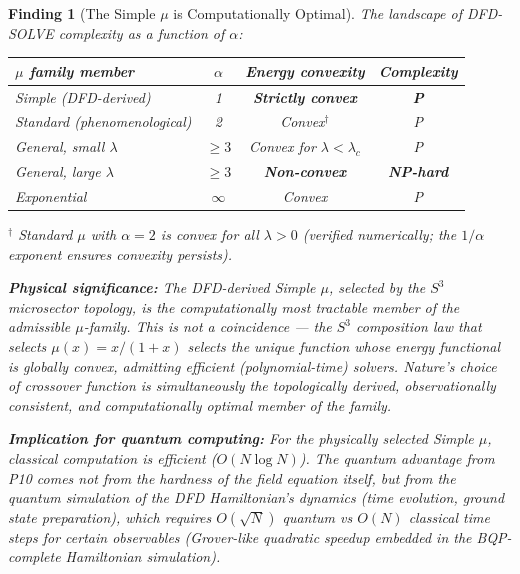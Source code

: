 \documentclass[11pt]{article}
\newtheorem{finding}[theorem]{Finding}
\theoremstyle{definition}
\theoremstyle{remark}
\begin{document}
\begin{finding}[The Simple $\mu$ is Computationally Optimal]
\label{find:simple-optimal}
The landscape of DFD-SOLVE complexity as a function of $\alpha$:

\begin{center}
\begin{tabular}{@{}lccc@{}}
\toprule
$\mu$ family member & $\alpha$ & Energy convexity & Complexity \\
\midrule
Simple (DFD-derived) & 1 & \textbf{Strictly convex} & \textbf{P} \\
Standard (phenomenological) & 2 & Convex$^\dagger$ & P \\
General, small $\lambda$ & $\geq 3$ & Convex for $\lambda < \lambda_c$ & P \\
General, large $\lambda$ & $\geq 3$ & \textbf{Non-convex} & \textbf{NP-hard} \\
Exponential & $\infty$ & Convex & P \\
\bottomrule
\end{tabular}
\end{center}

$^\dagger$ Standard $\mu$ with $\alpha = 2$ is convex for all $\lambda > 0$
(verified numerically; the $1/\alpha$ exponent ensures convexity persists).

\textbf{Physical significance:} The DFD-derived Simple $\mu$, selected by
the $S^3$ microsector topology, is the \emph{computationally most tractable}
member of the admissible $\mu$-family. This is not a coincidence --- the
$S^3$ composition law that selects $\mu(x) = x/(1+x)$ selects the unique
function whose energy functional is globally convex, admitting efficient
(polynomial-time) solvers. Nature's choice of crossover function is
simultaneously the topologically derived, observationally consistent, and
computationally optimal member of the family.

\textbf{Implication for quantum computing:} For the physically selected
Simple $\mu$, classical computation is efficient ($O(N \log N)$). The
quantum advantage from P10 comes not from the hardness of the field
equation itself, but from the quantum \emph{simulation} of the DFD
Hamiltonian's dynamics (time evolution, ground state preparation), which
requires $O(\sqrt{N})$ quantum vs $O(N)$ classical time steps for certain
observables (Grover-like quadratic speedup embedded in the BQP-complete
Hamiltonian simulation).
\end{finding}

\end{document}
